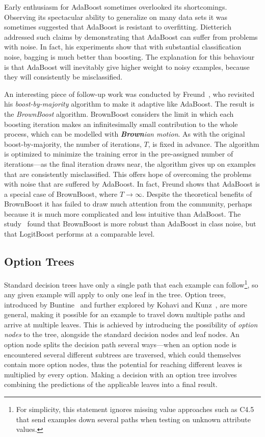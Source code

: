 Early enthusiasm for AdaBoost sometimes overlooked its shortcomings. Observing its spectacular ability to generalize on many data sets it was
sometimes suggested that AdaBoost is resistant to overfitting.
Dietterich~\cite{boostnoise} addressed such claims by demonstrating that AdaBoost can suffer from problems with noise. In fact, his experiments show that
with substantial classification noise, bagging is much better than
boosting. The explanation for this behaviour is that AdaBoost will
inevitably give higher weight to noisy examples, because they will
consistently be misclassified.

An interesting piece of follow-up work was conducted by Freund~\cite{brownboost}, who revisited his {\em boost-by-majority} algorithm to make it adaptive like AdaBoost. The result is the {\em BrownBoost} algorithm. BrownBoost considers the limit in which each boosting iteration makes an infinitesimally small contribution to the whole process, which can be modelled with {\it {\bf Brown}ian motion}. As with the original boost-by-majority, the number of iterations, $T$, is fixed in advance. The algorithm is optimized to minimize the training error in the pre-assigned number of iterations---as the final iteration draws near, the algorithm
gives up on examples that are consistently misclassified. This offers hope
of overcoming the problems with noise that are suffered by AdaBoost. In
fact, Freund shows that AdaBoost is a special case of BrownBoost, where $T
\to \infty$. Despite the theoretical benefits of BrownBoost it has
failed to draw much attention from the community, perhaps because it is
much more complicated and less intuitive than AdaBoost. The study~\cite{boost3exp} found that BrownBoost is more robust than AdaBoost in class noise, but that LogitBoost performs at a comparable level.


\subsection{Option Trees}
\label{sec:optiontreesbatch}

Standard decision trees have only a single path that each example can follow\footnote{For simplicity, this statement ignores missing value approaches such as C4.5 that send examples down several paths when testing on unknown attribute values.}, so any given example will apply to only one leaf in the tree. Option trees, introduced by Buntine~\cite{buntinetrees} and further explored by Kohavi and Kunz~\cite{kohaviot}, are more general, making it possible for an example to travel down multiple paths and arrive at multiple leaves. This is achieved by introducing the possibility of {\em option nodes} to the tree, alongside the standard decision nodes and leaf nodes. An option node splits the decision path several ways---when an option node is encountered several different subtrees are traversed, which could themselves contain more option nodes, thus the potential for reaching different leaves is multiplied by every option. Making a decision with an option tree involves combining the predictions of the applicable leaves into a final result.

